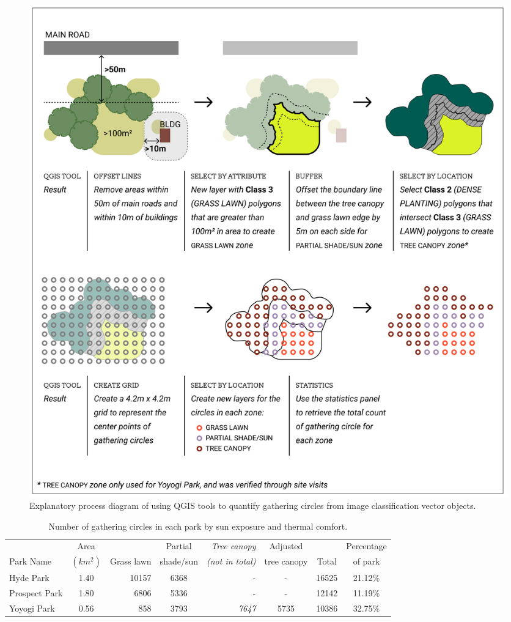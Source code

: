 \begin{multicols}{2}
\end{multicols}

\begin{figure}[h]
  \centering
  \captionsetup{width=1.0\linewidth}
  \includegraphics[width=1.0\textwidth]{images/gatherings/quantifying.png}
  \caption[Process diagram]{Explanatory process diagram of using QGIS tools to quantify gathering circles from image classification vector objects.} 
  \label{fig:quantifying}
\end{figure}

\begin{table}[h]
  \centering
\small
\begin{tabular}{lcrcrccc}
\toprule
{} &      Area &  {} &  Partial &  \emph{Tree canopy} &  Adjusted  &  {} &  Percentage\\
Park Name &      $ (km^{2}) $ &  Grass lawn &  shade/sun &  \emph{(not in total)} & tree canopy & Total &  of park\\
\midrule
Hyde Park &      1.40 &     10157 &           6368 &           - &               - &        16525 &     21.12\% \\
Prospect Park &      1.80 &      6806 &           5336 &           - &               - &        12142 &     11.19\% \\
Yoyogi Park &      0.56 &       858 &           3793 &        \emph{7647} &            5735 &        10386 &     32.75\% \\
\bottomrule
\end{tabular}
\caption[Gatherings gount]{Number of gathering circles in each park by sun exposure and thermal comfort.}
\label{gatherings_count}
\end{table}

